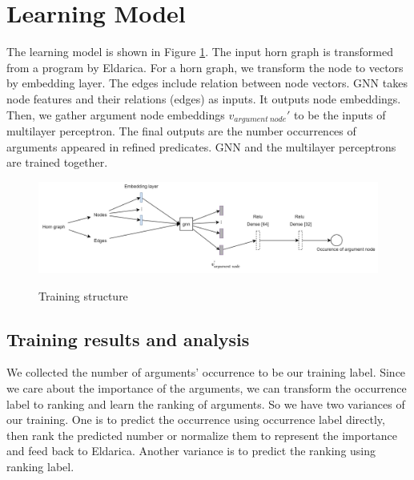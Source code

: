 \documentclass{article}
\begin{document}

\section{Learning Model}
The learning model is shown in Figure \ref{training-framework}. The input horn graph is transformed from a program by Eldarica. For a horn graph, we transform the node to vectors by embedding layer. The edges include relation between node vectors. GNN takes node features and their relations (edges) as inputs. It outputs node embeddings. Then, we gather argument node embeddings $v_{argument~node}'$ to be the inputs of multilayer perceptron. The final outputs are the number occurrences of arguments appeared in refined predicates. GNN and the multilayer perceptrons are trained together.

\begin{figure}[h]
\centering
  \includegraphics[width=16cm]{graph/training-framework}\\
  \caption{Training structure}\label{training-framework}
\end{figure}

\subsection{Training results and analysis}
We collected the number of arguments' occurrence to be our training label. Since we care about the importance of the arguments, we can transform the occurrence label to ranking and learn the ranking of arguments. So we have two variances of our training. One is to predict the occurrence using occurrence label directly, then rank the predicted number or normalize them to represent the importance and feed back to Eldarica. Another variance is to predict the ranking using ranking label.
\end{document}
